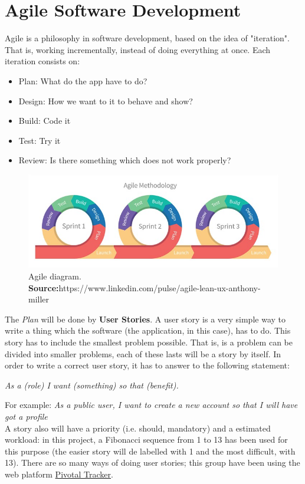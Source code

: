     
\section{Agile Software Development} \label{Agile}
\vspace{-5mm}
Agile is a philosophy in software development, based on the idea of "iteration". That is, working incrementally, instead of doing everything at once. Each iteration consists on:
\begin{itemize}
\setlength{\itemsep}{-5pt}
\item Plan: What do the app have to do?
\item Design: How we want to it to behave and show?
\item Build: Code it
\item Test: Try it
\item Review: Is there something which does not work properly?
\end{itemize}

\begin{figure}[H]
	\centering
    \includegraphics[trim={0 0 0 0},clip,width=1\textwidth]{Files/agile.jpg}
    \caption{Agile diagram.\\ \textbf{Source:}https://www.linkedin.com/pulse/agile-lean-ux-anthony-miller}
    \label{fig: Agile}
\end{figure}
The \textit{Plan} will be done by \textbf{User Stories}. A user story is a very simple way to write a thing which the software (the application, in this case), has to do. This story has to include the smallest problem possible. That is, is a problem can be divided into smaller problems, each of these lasts will be a story by itself. In order to write a correct user story, it has to answer to the following statement:
\begin{center}
\textit{As a (role) I want (something) so that (benefit).}
\end{center}
For example: \textit{As a public user, I want to create a new account so that I will have got a profile}\\
A story also will have a priority (i.e. should, mandatory) and a estimated workload: in this project, a Fibonacci sequence from 1 to 13 has been used for this purpose (the easier story will de labelled with 1 and the most difficult, with 13). There are so many ways of doing user stories; this group have been using the web platform \href{https://www.pivotaltracker.com/}{Pivotal Tracker}.
\cite{agile:modeling} 
\cite{agile:nutshell}
